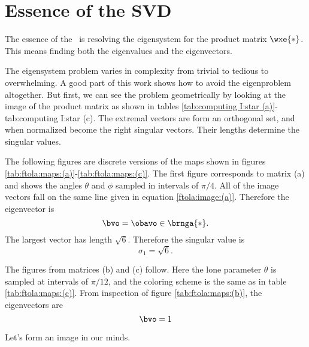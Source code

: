 \section{Essence of the SVD}

The essence of the \asvd \ is resolving the eigensystem for the product matrix $\wxe{*}$. This means finding both the eigenvalues and the eigenvectors.

The eigensystem problem varies in complexity from trivial to tedious to overwhelming. A good part of this work shows how to avoid the eigenproblem altogether. But first, we can see the problem geometrically by looking at the image of the product matrix as shown in tables \eqref{tab:computing I:star (a)}-{tab:computing I:star (c)}. The extremal vectors are form an orthogonal set, and when normalized become the right singular vectors. Their lengths determine the singular values. 

The following figures are discrete versions of the maps shown in figures \eqref{tab:ftola:maps:(a)}-\eqref{tab:ftola:maps:(c)}. The first figure corresponds to matrix (a) and shows the angles $\theta$ and $\phi$ sampled in intervals of $\pi / 4$.	All of the image vectors fall on the same line given in equation \eqref{ftola:image:(a)}. Therefore the eigenvector is
\begin{equation}
  \bvo = \obavo \in \brnga{*}.
\end{equation}
The largest vector has length $\sqrt{6}$. Therefore the singular value is
\begin{equation}
  \sigma_{1} = \sqrt{6}.
\end{equation}

The figures from matrices (b) and (c) follow. Here the lone parameter $\theta$ is sampled at intervals of $\pi / 12$, and the coloring scheme is the same as in table \eqref{tab:ftola:maps:(c)}. From inspection of figure \eqref{tab:ftola:maps:(b)}, the eigenvectors are
\begin{equation}
  \bvo = 1
\end{equation}

Let's form an image in our minds.


\endinput